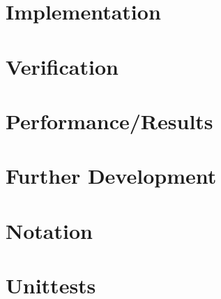 \documentclass[x11names,twoside,english]{uiofysmaster}
\begin{document}
\chapter{Implementation}
    
    
    
    

\chapter{Verification}
    
    
    
    
    
    

\chapter{Performance/Results}
    
    
    
    



%   
%
%   
%
\appendix
\chapter{Further Development}
    

\chapter{Notation}
    

\chapter{Unittests}
    
\end{document}
